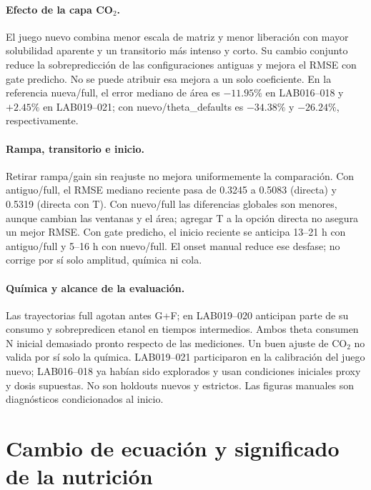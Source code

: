\documentclass[10pt,a4paper]{article}
\begin{document}
\paragraph{Efecto de la capa CO\(_2\).}
El juego nuevo combina menor escala de matriz y menor liberación con mayor
solubilidad aparente y un transitorio más intenso y corto. Su cambio conjunto
reduce la sobrepredicción de las configuraciones antiguas y mejora el RMSE
con gate predicho. No se puede atribuir esa mejora a un solo coeficiente.
En la referencia nueva/full, el error mediano de área es $-11.95\%$ en
LAB016--018 y $+2.45\%$ en LAB019--021; con nuevo/theta\_defaults es $-34.38\%$
y $-26.24\%$, respectivamente.

\paragraph{Rampa, transitorio e inicio.}
Retirar rampa/gain sin reajuste no mejora uniformemente la comparación.
Con antiguo/full, el RMSE mediano reciente pasa de 0.3245 a 0.5083
(directa) y 0.5319 (directa con T). Con nuevo/full las diferencias globales
son menores, aunque cambian las ventanas y el área; agregar T a la opción
directa no asegura un mejor RMSE. Con gate predicho, el inicio reciente se
anticipa 13--21 h con antiguo/full y 5--16 h con nuevo/full. El onset manual
reduce ese desfase; no corrige por sí solo amplitud, química ni cola.

\paragraph{Química y alcance de la evaluación.}
Las trayectorias full agotan antes G+F; en LAB019--020 anticipan parte de su
consumo y sobrepredicen etanol en tiempos intermedios. Ambos theta consumen
N inicial demasiado pronto respecto de las mediciones. Un buen ajuste de
CO\(_2\) no valida por sí solo la química. LAB019--021 participaron en la
calibración del juego nuevo; LAB016--018 ya habían sido explorados y usan
condiciones iniciales proxy y dosis supuestas. No son holdouts nuevos y
estrictos. Las figuras manuales son diagnósticos condicionados al inicio.

\clearpage
\section{Cambio de ecuación y significado de la nutrición}
\end{document}

